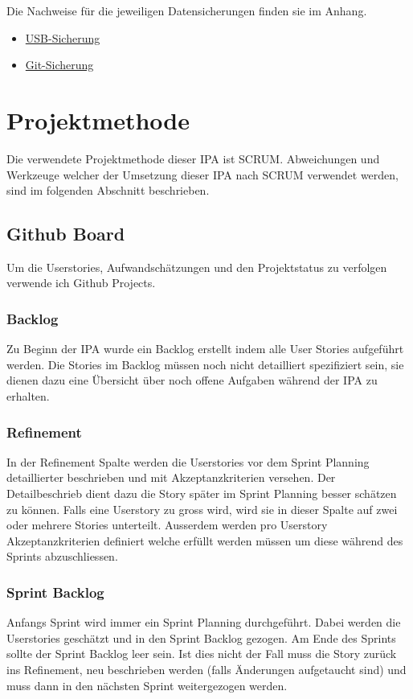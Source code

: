 Die Nachweise für die jeweiligen Datensicherungen finden sie im Anhang.
\begin{itemize}
    \item \hyperref[sec:savusb]{USB-Sicherung}
    \item \hyperref[sec:savgit]{Git-Sicherung}
\end{itemize}

\chapter{Projektmethode}
Die verwendete Projektmethode dieser IPA ist SCRUM. Abweichungen und Werkzeuge welcher der Umsetzung
dieser IPA nach SCRUM verwendet werden, sind im folgenden Abschnitt beschrieben.

\section{Github Board}
Um die Userstories, Aufwandschätzungen und den Projektstatus zu verfolgen verwende ich Github Projects. 

\subsection{Backlog}
Zu Beginn der IPA wurde ein Backlog erstellt indem alle User Stories aufgeführt werden. Die Stories im Backlog
müssen noch nicht detailliert spezifiziert sein, sie dienen dazu eine Übersicht über noch offene Aufgaben während
der IPA zu erhalten.

\subsection{Refinement}
In der Refinement Spalte werden die Userstories vor dem Sprint Planning detaillierter beschrieben und mit Akzeptanzkriterien versehen. 
Der Detailbeschrieb dient dazu die Story später im Sprint Planning besser schätzen zu können.
Falls eine Userstory zu gross wird, wird sie in dieser Spalte auf zwei oder mehrere Stories unterteilt. Ausserdem werden pro Userstory Akzeptanzkriterien
definiert welche erfüllt werden müssen um diese während des Sprints abzuschliessen.

\newpage

\subsection{Sprint Backlog}
Anfangs Sprint wird immer ein Sprint Planning durchgeführt. Dabei werden die Userstories geschätzt und in den Sprint Backlog gezogen. 
Am Ende des Sprints sollte der Sprint Backlog leer sein. Ist dies nicht der Fall muss die Story zurück ins Refinement, neu beschrieben werden 
(falls Änderungen aufgetaucht sind) und muss dann in den nächsten Sprint weitergezogen werden.

